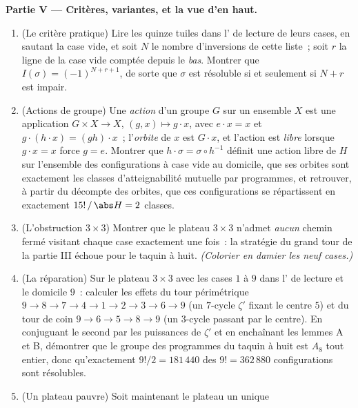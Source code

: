 \begin{problem}
\medskip
\noindent\textbf{Partie V --- Critères, variantes, et la vue d'en
haut.}
\begin{enumerate}[resume]
  \item (Le critère pratique) Lire les quinze tuiles dans l' de
        lecture de leurs cases, en sautant la case vide, et soit $N$
        le nombre d'inversions de cette liste~; soit $r$ la ligne de
        la case vide comptée depuis le \emph{bas}. Montrer que
        $I(\sigma) = (-1)^{N + r + 1}$, de sorte que $\sigma$ est
        résoluble si et seulement si $N + r$ est impair.
  \item (Actions de groupe) Une \emph{action} d'un groupe $G$ sur un
        ensemble $X$ est une application $G \times X \to X$, $(g, x)
        \mapsto g \cdot x$, avec $e \cdot x = x$ et $g \cdot (h \cdot
        x) = (gh) \cdot x$~; l'\emph{orbite} de $x$ est $G \cdot x$,
        et l'action est \emph{libre} lorsque $g \cdot x = x$ force $g
        = e$. Montrer que $h \cdot \sigma = \sigma \circ h^{-1}$
        définit une action libre de $H$ sur l'ensemble des
        configurations à case vide au domicile, que ses orbites sont
        exactement les classes d'atteignabilité mutuelle par
        programmes, et retrouver, à partir du décompte des orbites,
        que ces configurations se répartissent en exactement
        $15!\,/\,\abs H = 2$ classes.
  \item (L'obstruction $3 \times 3$) Montrer que le plateau $3 \times
        3$ n'admet \emph{aucun} chemin fermé visitant chaque case
        exactement une fois~: la stratégie du grand tour de la
        partie III échoue pour le taquin à huit. \emph{(Colorier en
        damier les neuf cases.)}
  \item (La réparation) Sur le plateau $3 \times 3$ avec les cases
        $1$ à $9$ dans l' de lecture et le domicile $9$~:
        calculer les effets du tour périmétrique $9 \to 8 \to 7 \to
        4 \to 1 \to 2 \to 3 \to 6 \to 9$ (un $7$-cycle $\zeta'$
        fixant le centre $5$) et du tour de coin $9 \to 6 \to 5 \to 8
        \to 9$ (un $3$-cycle passant par le centre). En conjuguant le
        second par les puissances de $\zeta'$ et en enchaînant les
        lemmes A et B, démontrer que le groupe des programmes du
        taquin à huit est $A_8$ tout entier, donc qu'exactement
        $9!/2 = 181\,440$ des $9! = 362\,880$ configurations sont
        résolubles.
  \item (Un plateau pauvre) Soit maintenant le plateau un unique

\end{enumerate}
\end{problem}
